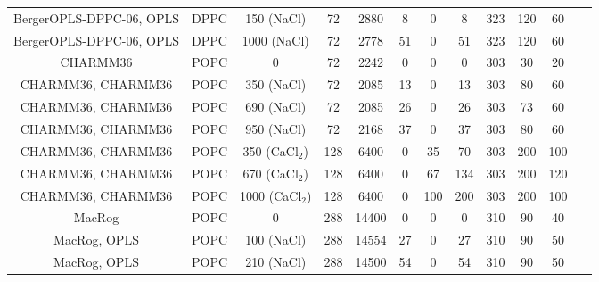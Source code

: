 \documentclass[pre,aps,floatfix,authordate1-4,twocolumn]{revtex4-1}
\begin{document}
\begin{table}[htb]
\begin{tabular}{c c c c c c c c c c c c}
  BergerOPLS-DPPC-06\cite{tieleman06}, OPLS\cite{aqvist90} &   DPPC & 150 (NaCl) & 72 & 2880 & 8  & 0  & 8 &323  & 120 & 60 &\cite{bergerOPLSDPPCfiles150mMnacl} \\
  BergerOPLS-DPPC-06\cite{tieleman06}, OPLS\cite{aqvist90} &   DPPC & 1000 (NaCl) & 72 & 2778 & 51  & 0  & 51 &323  & 120 & 60 &\cite{bergerOPLSDPPCfiles1000mMnacl} \\
  \hline
  CHARMM36\cite{klauda10}   & POPC & 0           & 72 & 2242 & 0  & 0 & 0 & 303  & 30 & 20 & \cite{charmm36filesSHORT} \\
  CHARMM36\cite{klauda10}, CHARMM36\cite{venable13} & POPC & 350 (NaCl)  & 72 & 2085 & 13  & 0 & 13 & 303  & 80 & 60 & \cite{charmmPOPC350mMNaClfiles} \\
  CHARMM36\cite{klauda10}, CHARMM36\cite{venable13} & POPC & 690 (NaCl)  & 72 & 2085 & 26  & 0 & 26 & 303  & 73 & 60 & \cite{charmmPOPC690mMNaClfiles}   \\
  CHARMM36\cite{klauda10}, CHARMM36\cite{venable13}  & POPC & 950 (NaCl)  & 72 & 2168 & 37  & 0 & 37 & 303  & 80 & 60 &\cite{charmmPOPC950mMNaClfiles}  \\
  CHARMM36\cite{klauda10}, CHARMM36 & POPC &  350 (CaCl$_2$)  & 128 & 6400 & 0& 35 & 70 & 303  & 200  & 100 & \cite{charmmPOPC350mMCaClfiles}  \\
  CHARMM36\cite{klauda10}, CHARMM36 & POPC &  670 (CaCl$_2$)  & 128 & 6400 & 0& 67 & 134 & 303  & 200  & 120 & \cite{charmmPOPC670mMCaClfiles}  \\  
  CHARMM36\cite{klauda10}, CHARMM36 & POPC &  1000 (CaCl$_2$) & 128 & 6400 & 0& 100 & 200 & 303 & 200  & 100 & \cite{charmmPOPC1000mMCaClfiles}  \\
  \hline
  MacRog\cite{maciejewski14}  & POPC & 0 & 288 & 14400 & 0 & 0 & 0 & 310 & 90&40  &~\cite{macrogdehydFILES}  \\
  MacRog\cite{maciejewski14}, OPLS\cite{aqvist90}  & POPC & 100 (NaCl) & 288 & 14554 & 27 & 0 & 27 & 310 & 90&50  & \cite{macrogIONfiles} \\
  MacRog\cite{maciejewski14}, OPLS\cite{aqvist90}  & POPC &  210 (NaCl) & 288 & 14500 & 54 & 0 & 54 & 310 & 90&50  &\cite{macrogIONfiles}  \\

\end{tabular}
\end{table}
\end{document}
